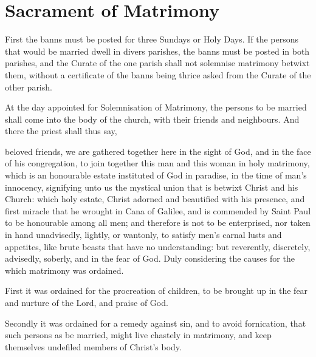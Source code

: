 \section{Sacrament of Matrimony}
\fancyhead[RE,LO]{}
\begin{rubric}
First the banns must be posted for three Sundays or Holy Days. If the persons that would be married dwell in divers parishes, the banns must be posted in both parishes, and the Curate of the one parish shall not solemnise matrimony betwixt them, without a certificate of the banns being thrice asked from the Curate of the other parish.\par
At the day appointed for Solemnisation of Matrimony, the persons to be married shall come into the body of the church, with their friends and neighbours. And there the priest shall thus say,
\end{rubric}
 beloved friends, we are gathered together here in the sight of God, and in the face of his congregation, to join together this man and this woman in holy matrimony, which is an honourable estate instituted of God in paradise, in the time of man's innocency, signifying unto us the mystical union that is betwixt Christ and his Church: which holy estate, Christ adorned and beautified with his presence, and first miracle that he wrought in Cana of Galilee, and is commended by Saint Paul to be honourable among all men; and therefore is not to be enterprised, nor taken in hand unadvisedly, lightly, or wantonly, to satisfy men's carnal lusts and appetites, like brute beasts that have no understanding: but reverently, discretely, advisedly, soberly, and in the fear of God. Duly considering the causes for the which matrimony was ordained.
\par
{}
First it was ordained for the procreation of children, to be brought up in the fear and nurture of the Lord, and praise of God.\par
Secondly it was ordained for a remedy against sin, and to avoid fornication, that such persons as be married, might live chastely in matrimony, and keep themselves undefiled members of Christ's body.\par
